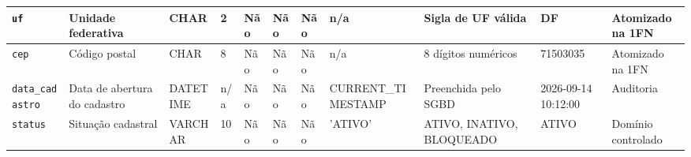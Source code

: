 \begin{table}[!t]
\begin{tabular}{|L{2.15cm}|L{2.7cm}|L{1.15cm}|C{0.62cm}|C{0.62cm}|C{0.5cm}|C{0.5cm}|L{1.45cm}|L{2.6cm}|L{2.0cm}|L{1.85cm}|}
\hline
\texttt{uf} & Unidade federativa & CHAR & 2 & N\~ao & N\~ao & N\~ao & n/a & Sigla de UF v\'alida & DF & Atomizado na 1FN \\
\hline
\texttt{cep} & C\'odigo postal & CHAR & 8 & N\~ao & N\~ao & N\~ao & n/a & 8 d\'igitos num\'ericos & 71503035 & Atomizado na 1FN \\
\hline
\texttt{data\_\allowbreak{}cadastro} & Data de abertura do cadastro & DATETIME & n/a & N\~ao & N\~ao & N\~ao & CURRENT\_\allowbreak{}TIMESTAMP & Preenchida pelo SGBD & 2026-09-14 10:12:00 & Auditoria \\
\hline
\texttt{status} & Situa\c{c}\~ao cadastral & VARCHAR & 10 & N\~ao & N\~ao & N\~ao & 'ATIVO' & ATIVO, INATIVO, BLOQUEADO & ATIVO & Dom\'inio controlado \\
\hline
\end{tabular}
\end{table}

